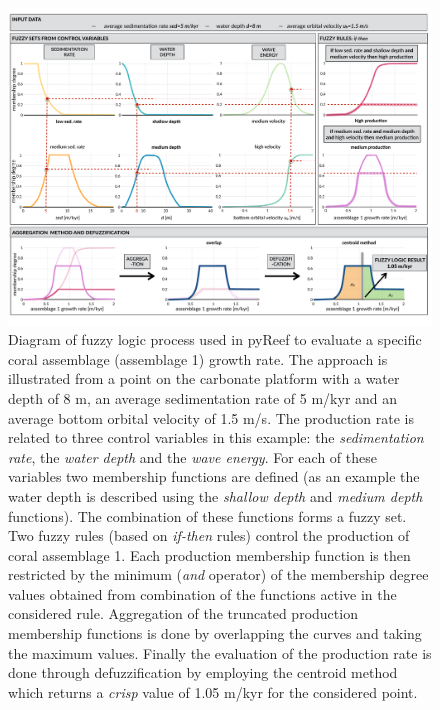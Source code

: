 \documentclass[default,jgrga]{agutex2015}
\begin{document}
\begin{article}
\begin{figure}
\centering
\noindent\includegraphics[width=37pc]{figs/fig3.pdf}
\caption{Diagram of fuzzy logic process used in pyReef to evaluate a specific coral assemblage (assemblage 1) growth rate. The approach is illustrated from a point on the carbonate platform with a water depth of 8 m, an average sedimentation rate of 5 m/kyr and an average bottom orbital velocity of 1.5 m/s. The production rate is related to three control variables in this example: the \textit{sedimentation rate}, the \textit{water depth} and the \textit{wave energy}. For each of these variables two membership functions are defined (as an example the water depth is described using the \textit{shallow depth} and \textit{medium depth} functions). The combination of these functions forms a fuzzy set. Two fuzzy rules (based on \textit{if-then} rules) control the production of coral assemblage 1. Each production membership function is then restricted by the minimum (\textit{and} operator) of the membership degree values obtained from combination of the functions active in the considered rule. Aggregation of the truncated production membership functions is done by overlapping the curves and taking the maximum values. Finally the evaluation of the production rate is done through defuzzification by employing the centroid method which returns a \textit{crisp} value of 1.05 m/kyr for the considered point.
}
\label{fuzzyfig}
\end{figure}


\end{article}
\end{document}
